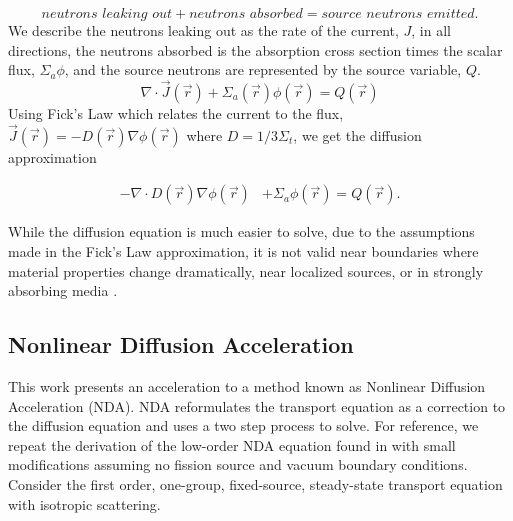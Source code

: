 \begin{equation}
    \textit{neutrons leaking out} + \textit{neutrons absorbed} = \textit{source neutrons emitted}.
\end{equation}
We describe the neutrons leaking out as the rate of the current, $J$, in all directions, the neutrons absorbed is the absorption cross section times the scalar flux, $\Sigma_a\phi$, and the source neutrons are represented by the source variable, $Q$. 
\begin{equation}
    \nabla\cdot \vec{J}(\vec{r}) + \Sigma_a(\vec{r})\phi(\vec{r}) = Q(\vec{r})
\end{equation}
Using Fick's Law which relates the current to the flux, $\vec{J}(\vec{r}) = -D(\vec{r})\nabla\phi(\vec{r})$ where $D = 1/3\Sigma_t$, we get the diffusion approximation

\begin{equation}
\begin{split}
 - \nabla \cdot D(\vec{r})\nabla\phi(\vec{r}) &+ \Sigma_a \phi(\vec{r}) = Q(\vec{r}).
\end{split}
\label{eq:diffusion_fixed_source}
\end{equation}

While the diffusion equation is much easier to solve, due to the assumptions made in the Fick's Law approximation, it is not valid near boundaries where material properties change dramatically, near localized sources, or in strongly absorbing media \cite{lewis-miller}.

\subsection{Nonlinear Diffusion Acceleration}
This work presents an acceleration to a method known as Nonlinear Diffusion Acceleration (NDA). NDA reformulates the transport equation as a correction to the diffusion equation and uses a two step process to solve. For reference, we repeat the derivation of the low-order NDA equation found in \cite{morel-holo} with small modifications assuming no fission source and vacuum boundary conditions. Consider the first order, one-group, fixed-source, steady-state \sn transport equation with isotropic scattering. 

